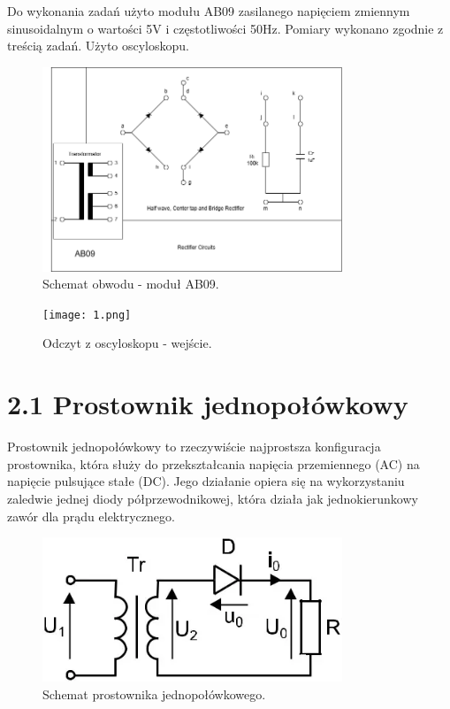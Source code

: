 \documentclass[a4paper,12pt]{article}
\begin{document}
Do wykonania zadań użyto modułu AB09 zasilanego napięciem zmiennym sinusoidalnym o wartości 5V i częstotliwości 50Hz. Pomiary wykonano zgodnie z treścią zadań. Użyto oscyloskopu.
\begin{figure}[h]
    \centering
    \includegraphics[width=0.8\textwidth]{AB09.png}
    \caption{Schemat obwodu - moduł AB09.}
    \label{fig:schemat}
\end{figure}
\begin{figure}[h]
    \centering
    \texttt{[image: 1.png]}
    \caption{Odczyt z oscyloskopu - wejście.}
    \label{fig:schemat}
\end{figure}
\section*{2.1 Prostownik jednopołówkowy}
Prostownik jednopołówkowy to rzeczywiście najprostsza konfiguracja prostownika, która służy do przekształcania napięcia przemiennego (AC) na napięcie pulsujące stałe (DC). Jego działanie opiera się na wykorzystaniu zaledwie jednej diody półprzewodnikowej, która działa jak jednokierunkowy zawór dla prądu elektrycznego.
\begin{figure}[h]
    \centering
    \includegraphics[width=0.8\textwidth]{2.png}
    \caption{Schemat prostownika jednopołówkowego.}
    \label{fig:schemat}
\end{figure}
\end{document}
